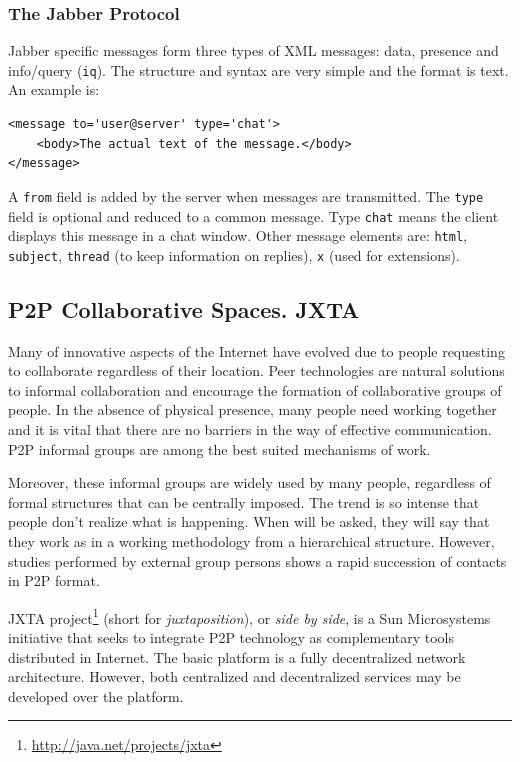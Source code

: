 \subsubsection{The Jabber Protocol}

Jabber specific messages form three types of XML messages: data, presence
and info/query (\texttt{iq}). The structure and syntax are very simple and the
format is text. An example is:

\begin{verbatim}
<message to='user@server' type='chat'>
    <body>The actual text of the message.</body>
</message>
\end{verbatim}

A \texttt{from} field is added by the server when messages are
transmitted. The \texttt{type} field is optional and reduced to a common message. Type
\texttt{chat} means the client displays this message in a chat window.
Other message elements are: \texttt{html}, \texttt{subject}, \texttt{thread}
(to keep information on replies), \texttt{x} (used for extensions).

\subsection{P2P Collaborative Spaces. JXTA}

Many of innovative aspects of the Internet have evolved due to people
requesting to collaborate regardless of their location. Peer
technologies are natural solutions to informal collaboration and encourage
the formation of collaborative groups of people. In the absence of physical
presence, many people need working together and it is vital that there are no
barriers in the way of effective communication. P2P informal groups are among
the best suited mechanisms of work.

Moreover, these informal groups are widely used by many people, regardless of
formal structures that can be centrally imposed. The trend is so intense that
people don't realize what is happening. When will be asked, they will say that
they work as in a working methodology from a hierarchical structure. However,
studies performed by external group persons shows a rapid succession of
contacts in P2P format.

JXTA project\footnote{\url{http://java.net/projects/jxta}} (short for \textit{juxtaposition}), or
\textit{side by side}, is a Sun
Microsystems initiative that seeks to integrate P2P technology as
complementary tools distributed in Internet. The basic platform is a fully
decentralized network architecture. However, both centralized and
decentralized services may be developed over the platform.

